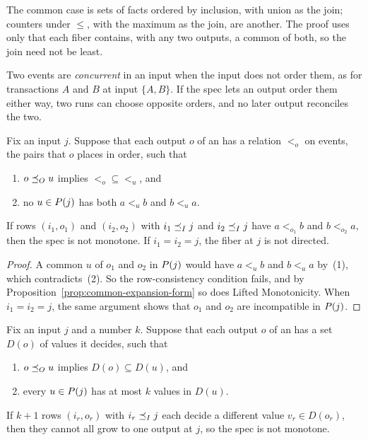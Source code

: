 The common case is sets of facts ordered by inclusion, with union as the join;
counters under $\leq$, with the maximum as the join, are another.  The proof
uses only that each fiber contains, with any two outputs, a common \outnoun of
both, so the join need not be least.

Two events are \emph{concurrent} in an input when the input does not order
them, as for transactions $A$ and $B$ at input $\{A,B\}$.  If the spec lets an
output order them either way, two runs can choose opposite orders, and no
later output reconciles the two.

\begin{lemma}
\label{lem:order-commitment}
Fix an input $j$.  Suppose that each output $o$ of an \spectype has a relation
$<_o$ on events, the pairs that $o$ places in order, such that
\begin{enumerate}
  \item $o\preceq_O u$ implies ${<_o}\subseteq{<_u}$, and
  \item no $u\in P(j)$ has both $a<_u b$ and $b<_u a$.
\end{enumerate}
If rows $(i_1,o_1)$ and $(i_2,o_2)$ with $i_1\preceq_I j$ and $i_2\preceq_I j$
have $a<_{o_1}b$ and $b<_{o_2}a$, then the spec is not monotone.  If
$i_1=i_2=j$, the fiber at $j$ is not directed.
\end{lemma}

\begin{proof}
A common \outnoun $u$ of $o_1$ and $o_2$ in $P(j)$ would have $a<_u b$
and $b<_u a$ by~(1), which contradicts~(2).  So the row-consistency condition
fails, and by Proposition~\ref{prop:common-expansion-form} so does Lifted
Monotonicity.  When $i_1=i_2=j$, the same argument shows that $o_1$ and $o_2$
are incompatible in $P(j)$.
\end{proof}

\begin{lemma}
\label{lem:bounded-values}
Fix an input $j$ and a number $k$.  Suppose that each output $o$ of an
\spectype has a set $D(o)$ of values it decides, such that
\begin{enumerate}
  \item $o\preceq_O u$ implies $D(o)\subseteq D(u)$, and
  \item every $u\in P(j)$ has at most $k$ values in $D(u)$.
\end{enumerate}
If $k+1$ rows $(i_r,o_r)$ with $i_r\preceq_I j$ each decide a different value
$v_r\in D(o_r)$, then they cannot all grow to one output at $j$, so the spec is
not monotone.
\end{lemma}

